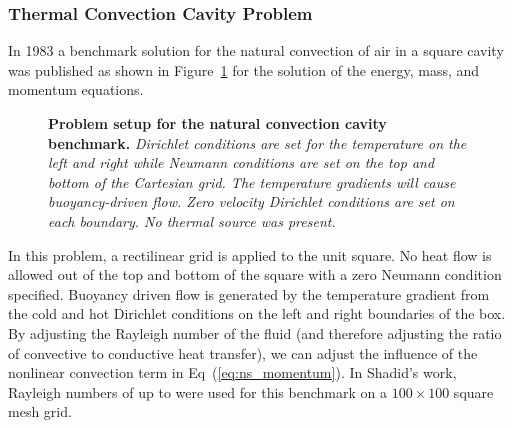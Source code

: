 \subsubsection{Thermal Convection Cavity Problem}
\label{subsubsec:natural_convection_cavity}
In 1983 a benchmark solution for the natural convection of air in a
square cavity was published \citep{de_vahl_davis_natural_1983} as
shown in Figure~\ref{fig:natural_convection_cavity} for the solution
of the energy, mass, and momentum equations.
\begin{figure}[htpb!]
  \begin{center}
    \scalebox{1.5}{
       }
  \end{center}
  \caption{\textbf{Problem setup for the natural convection cavity
      benchmark.} \textit{Dirichlet conditions are set for the
      temperature on the left and right while Neumann conditions are
      set on the top and bottom of the Cartesian grid. The temperature
      gradients will cause buoyancy-driven flow. Zero velocity
      Dirichlet conditions are set on each boundary. No thermal source
      was present.}}
  \label{fig:natural_convection_cavity}
\end{figure}
In this problem, a rectilinear grid is applied to the unit square. No
heat flow is allowed out of the top and bottom of the square with a
zero Neumann condition specified. Buoyancy driven flow is generated by
the temperature gradient from the cold and hot Dirichlet conditions on
the left and right boundaries of the box. By adjusting the Rayleigh
number of the fluid (and therefore adjusting the ratio of convective
to conductive heat transfer), we can adjust the influence of the
nonlinear convection term in Eq~(\ref{eq:ns_momentum}). In Shadid's
work, Rayleigh numbers of up to  were used for this benchmark
on a $100 \times 100$ square mesh grid.

